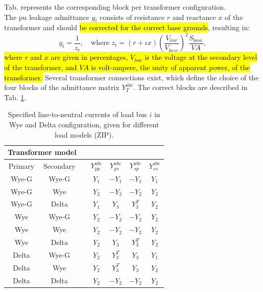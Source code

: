 \documentclass[10pt,journal]{article}
\begin{document}
Tab. represents the corresponding block per transformer configuration. \\
The pu leakage admittance $y_t$ consists of resistance $r$ and reactance $x$ of the transformer and should \hl{be corrected for the correct base grounds}, resulting in: 
\begin{equation}
    y_t = \frac{1}{z_t},\quad\mbox{where } z_t = (r+\iota x)(\frac{V_{low}}{V_{base}})^2\frac{S_{base}}{VA},
\end{equation}
\hl{where $r$ and $x$ are given in percentages, $V_{low}$ is the voltage at the secondary level of the transformer, and $VA$ is volt-ampere, the unity of apparent power, of the transformer.  }
Several transformer connections exist, which define the choice of the four blocks of the admittance matrix $Y_T^{abc}$. The correct blocks are described in Tab. \ref{tab:trafoblocks}. 

 \begin{table}[h]
\renewcommand{\arraystretch}{1.1}
\centering
\caption{Specified line-to-neutral currents of load bus $i$ in Wye and Delta configuration, given for different load models (ZIP). }\label{tab:trafoblocks}
\small
\begin{tabular}{ccccccc}
\toprule
\multicolumn{2}{c}{\textbf{Transformer model}} && \multicolumn{4}{c}{}  \\ 
\midrule
Primary & Secondary && $Y_{pp}^{abc}$ & $Y_{ps}^{abc}$ & $Y_{sp}^{abc}$ & $Y_{ss}^{abc}$  \\
\midrule 
Wye-G & Wye-G && $Y_1$ & $-Y_1$ & $-Y_1$ & $Y_1$\\
Wye-G & Wye   && $Y_2$ & $-Y_2$ & $-Y_2$ & $Y_2$\\
Wye-G & Delta && $Y_1$ & $Y_3$ & $Y_3^T$ & $Y_2$\\
Wye & Wye-G   && $Y_2$ & $-Y_2$ & $-Y_2$ & $Y_2$\\
Wye & Wye     && $Y_2$ & $-Y_2$ & $-Y_2$ & $Y_2$\\
Wye & Delta   && $Y_2$ & $Y_3$ & $Y_3^T$ & $Y_2$\\
Delta & Wye-G && $Y_2$ & $Y_3^T$ & $Y_3$ & $Y_1$\\
Delta & Wye   && $Y_2$ & $Y_3^T$ & $Y_3$ & $Y_2$\\
Delta & Delta && $Y_2$ & $-Y_2$ & $-Y_2$ & $Y_2$\\
\bottomrule
\end{tabular}
\end{table}
\end{document}
